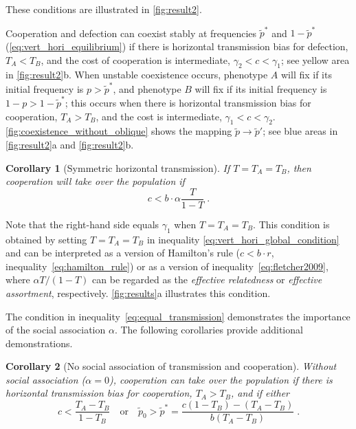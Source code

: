 \documentclass[12pt]{extarticle}
\newtheorem{corollary}{Corollary}
\begin{document}
{These conditions are illustrated in \autoref{fig:result2}.

Cooperation and defection can coexist stably at frequencies $\tilde{p}^*$ and $1-\tilde{p}^*$ (\autoref{eq:vert_hori_equilibrium}) if there is horizontal transmission bias for defection, $T_A<T_B$, and the cost of cooperation is intermediate, $\gamma_2 < c < \gamma_1$; see yellow area in \autoref{fig:result2}b.
When unstable coexistence occurs, phenotype $A$ will fix if its initial frequency is $p>\tilde{p}^*$, and phenotype $B$ will fix if its initial frequency is $1-p>1-\tilde{p}^*$; this occurs when there is horizontal transmission bias for cooperation, $T_A>T_B$, and the cost is intermediate, $\gamma_1 < c < \gamma_2$.
\autoref{fig:coexistence_without_oblique} shows the mapping $\tilde p \to \tilde p'$; see blue areas in \autoref{fig:result2}a and \autoref{fig:result2}b.
\\

\begin{corollary}[Symmetric horizontal transmission] 
\label{corollary:equal_transmission}
If $T=T_A=T_B$, then cooperation will take over the population if
\begin{equation}
\label{eq:equal_transmission}
c < b \cdot \alpha \frac{T}{1-T} \;.
\end{equation}
\end{corollary}
Note that the right-hand side equals $\gamma_1$ when $T=T_A=T_B$.
This condition is obtained by setting $T=T_A=T_B$ in inequality \ref{eq:vert_hori_global_condition} and can be interpreted as a version of Hamilton's rule  ($c<b\cdot r$, inequality~\ref{eq:hamilton_rule}) or as a version of inequality~\ref{eq:fletcher2009}, where $\alpha T/(1-T)$ can be regarded as the \emph{effective relatedness} or \emph{effective assortment}, respectively.
\autoref{fig:results}a illustrates this condition. 

The condition in inequality~\ref{eq:equal_transmission} demonstrates the importance of the social association $\alpha$. The following corollaries provide additional demonstrations.
\\

\begin{corollary}[No social association of transmission and cooperation]
\label{corollary:alpha0}
Without social association ($\alpha=0$), cooperation can take over the population if there is horizontal transmission bias for cooperation, $T_A>T_B$, and if either
\begin{equation}
\label{eq:vert_hori_alpha0}
c < \frac{T_A-T_B}{1-T_B}
\quad \text{or} \quad
\tilde{p}_0 > \tilde{p}^* = \frac{c(1-T_B) - (T_A-T_B)}{b (T_A-T_B)} \;.
\end{equation}
\end{corollary}

}
\end{document}
